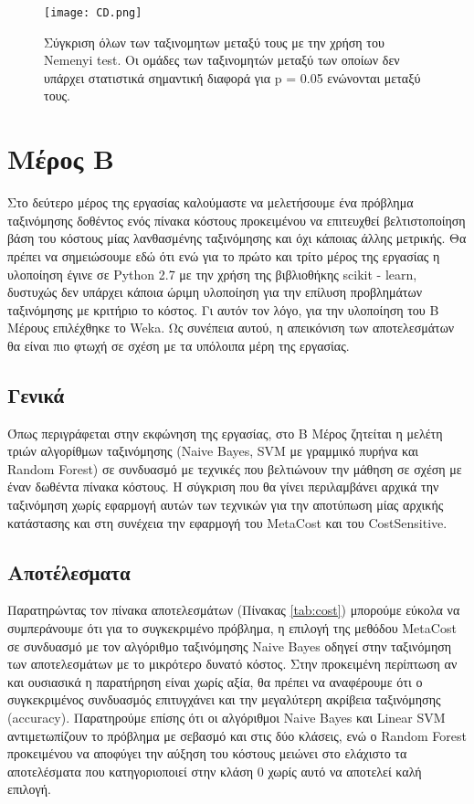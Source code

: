 \begin{figure}
	\centering
	\texttt{[image: CD.png]} %
	\caption{Σύγκριση όλων των ταξινομητων μεταξύ τους με την χρήση του Nemenyi test. Οι ομάδες των ταξινομητών μεταξύ των οποίων δεν υπάρχει στατιστικά σημαντική διαφορά για p = 0.05 ενώνονται μεταξύ τους.}
	\label{fig:CD}
\end{figure}


\section{Μέρος Β}
Στο δεύτερο μέρος της εργασίας καλούμαστε να μελετήσουμε ένα πρόβλημα ταξινόμησης δοθέντος ενός πίνακα κόστους προκειμένου να επιτευχθεί βελτιστοποίηση βάση του κόστους μίας λανθασμένης ταξινόμησης και όχι κάποιας άλλης μετρικής. Θα πρέπει να σημειώσουμε εδώ ότι ενώ για το πρώτο και τρίτο μέρος της εργασίας η υλοποίηση έγινε σε Python 2.7 με την χρήση της βιβλιοθήκης scikit - learn, δυστυχώς δεν υπάρχει κάποια ώριμη υλοποίηση για την επίλυση προβλημάτων ταξινόμησης με κριτήριο το κόστος. Γι αυτόν τον λόγο, για την υλοποίηση του Β Μέρους επιλέχθηκε το Weka. Ως συνέπεια αυτού, η απεικόνιση των αποτελεσμάτων θα είναι πιο φτωχή σε σχέση με τα υπόλοιπα μέρη της εργασίας.


\subsection{Γενικά}
Όπως περιγράφεται στην εκφώνηση της εργασίας, στο Β Μέρος ζητείται η μελέτη τριών αλγορίθμων ταξινόμησης (Naive Bayes, SVM με γραμμικό πυρήνα και Random Forest) σε συνδυασμό με τεχνικές που βελτιώνουν την μάθηση σε σχέση με έναν δωθέντα πίνακα κόστους. Η σύγκριση που θα γίνει περιλαμβάνει αρχικά την ταξινόμηση χωρίς εφαρμογή αυτών των τεχνικών για την αποτύπωση μίας αρχικής κατάστασης και στη συνέχεια την εφαρμογή του MetaCost και του CostSensitive. 

\subsection{Αποτέλεσματα}
Παρατηρώντας τον πίνακα αποτελεσμάτων (Πίνακας \ref{tab:cost}) μπορούμε εύκολα να συμπεράνουμε ότι για το συγκεκριμένο πρόβλημα, η επιλογή της μεθόδου MetaCost σε συνδυασμό με τον αλγόριθμο ταξινόμησης Naive Bayes οδηγεί στην ταξινόμηση των αποτελεσμάτων με το μικρότερο δυνατό κόστος. Στην προκειμένη περίπτωση αν και ουσιασικά η παρατήρηση είναι χωρίς αξία, θα πρέπει να αναφέρουμε ότι ο συγκεκριμένος συνδυασμός επιτυγχάνει και την μεγαλύτερη ακρίβεια ταξινόμησης (accuracy). Παρατηρούμε επίσης ότι οι αλγόριθμοι Naive Bayes και Linear SVM αντιμετωπίζουν το πρόβλημα με σεβασμό και στις δύο κλάσεις, ενώ ο Random Forest προκειμένου να αποφύγει την αύξηση του κόστους μειώνει στο ελάχιστο τα αποτελέσματα που κατηγοριοποιεί στην κλάση 0 χωρίς αυτό να αποτελεί καλή επιλογή. 


